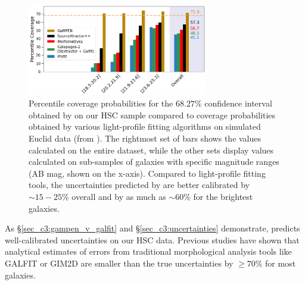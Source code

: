 \begin{figure}[htb]
    \centering
    \includegraphics[width = 0.7\textwidth]{cov_prob_euclud_comp.png}
    \caption{Percentile coverage probabilities for the $68.27\%$ confidence interval obtained by \gampen{} on our HSC sample compared to coverage probabilities obtained by various light-profile fitting algorithms on simulated Euclid data %
    (from \citealp{euclid_morph}). The rightmost set of bars shows the values calculated on the entire dataset, while the other sets display values calculated on sub-samples of galaxies with specific magnitude ranges (AB mag, shown on the x-axis). %
    Compared to light-profile fitting tools, the uncertainties predicted by \gampen{} are better calibrated by $\sim15-25\%$ overall and by as much as $\sim60\%$ for the brightest galaxies.}
    \label{fig_c3:cov_prob_comp_euclud}
\end{figure}

As \S \ref{sec_c3:gampen_v_galfit} and \S\ref{sec_c3:uncertainties} demonstrate, \gampen{} predicts well-calibrated uncertainties on our HSC data. Previous studies \citep[e.g.,][]{haussler_07} have shown that analytical estimates of errors from traditional morphological analysis tools like GALFIT or GIM2D \citep{gim2d} are smaller than the true uncertainties by $\geq70\%$ for most galaxies.

